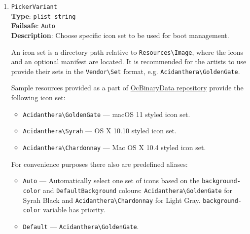 \documentclass[]{article}
\providecommand{\tightlist}{%
  \setlength{\itemsep}{0pt}\setlength{\parskip}{0pt}}
\begin{document}
\begin{enumerate}
  \emph{Note 3}: On Macs with problematic GOP, it may be difficult to re-bless OpenCore if its bless status
  is lost. The \texttt{BootKicker} utility can be used to work around this problem, if set up as a Tool
  in OpenCore with \texttt{FullNvramAccess} enabled. It will launch the Apple picker,
  which allows selection of an item to boot next (with \texttt{Enter}), or next and from then on until
  the next change (with \texttt{CTRL+Enter}). Note that after the selection is made, the system
  \emph{will reboot} before the chosen entry is booted. While this behaviour might seem surprising,
  it can be used both to switch which OpenCore installation is blessed, with \texttt{CTRL+Enter},
  e.g. from a recovery OpenCore installation on CD (selected with the \texttt{C} key on boot) back
  to the main installation of OpenCore on the hard drive, if this is lost after an NVRAM reset. It can
  also be used, even when the native picker cannot be shown normally (unsupported GPU), to do a one-shot
  boot without OpenCore, e.g. to another OS or tool, or to an earlier version of macOS.

\item
  \texttt{PickerVariant}\\
  \textbf{Type}: \texttt{plist\ string}\\
  \textbf{Failsafe}: \texttt{Auto}\\
  \textbf{Description}: Choose specific icon set to be used for boot management.

  An icon set is a directory path relative to \texttt{Resources\textbackslash Image},
  where the icons and an optional manifest are located. It is recommended for
  the artists to use provide their sets in the \texttt{Vendor\textbackslash Set} format,
  e.g. \texttt{Acidanthera\textbackslash GoldenGate}.

  Sample resources provided as a part of
  \href{https://github.com/acidanthera/OcBinaryData}{OcBinaryData repository}
  provide the following icon set:
  \begin{itemize}
    \tightlist
    \item \texttt{Acidanthera\textbackslash GoldenGate} --- macOS 11 styled icon set.
    \item \texttt{Acidanthera\textbackslash Syrah} --- OS X 10.10 styled icon set.
    \item \texttt{Acidanthera\textbackslash Chardonnay} --- Mac OS X 10.4 styled icon set.
  \end{itemize}

  For convenience purposes there also are predefined aliases:
  \begin{itemize}
    \tightlist
    \item \texttt{Auto} --- Automatically select one set of icons based on the \texttt{background-color}
      and \texttt{DefaultBackground} colours: \texttt{Acidanthera\textbackslash GoldenGate} for Syrah Black and
      \texttt{Acidanthera\textbackslash Chardonnay} for Light Gray. \texttt{background-color} variable has
      priority.
    \item \texttt{Default} --- \texttt{Acidanthera\textbackslash GoldenGate}.
  \end{itemize}


\end{enumerate}
\end{document}
